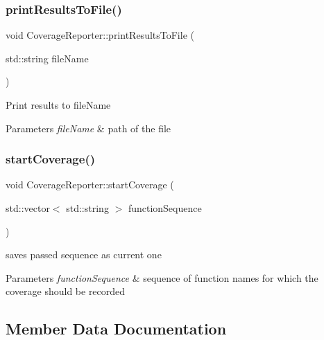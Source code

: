 \subsubsection{\texorpdfstring{print\+Results\+To\+File()}{printResultsToFile()}\hspace{0.1cm}{\footnotesize\ttfamily [2/2]}}
{\footnotesize\ttfamily void Coverage\+Reporter\+::print\+Results\+To\+File (\begin{DoxyParamCaption}\item[{std\+::string}]{file\+Name }\end{DoxyParamCaption})}

Print results to file\+Name 
\begin{DoxyParams}{Parameters}
{\em file\+Name} & path of the file \\
\hline
\end{DoxyParams}
\mbox{\label{classCoverageReporter_a560eff3e34be25d1a49c37ffd99e69c1}} 
\subsubsection{\texorpdfstring{start\+Coverage()}{startCoverage()}}
{\footnotesize\ttfamily void Coverage\+Reporter\+::start\+Coverage (\begin{DoxyParamCaption}\item[{std\+::vector$<$ std\+::string $>$}]{function\+Sequence }\end{DoxyParamCaption})}

saves passed sequence as current one 
\begin{DoxyParams}{Parameters}
{\em function\+Sequence} & sequence of function names for which the coverage should be recorded \\
\hline
\end{DoxyParams}


\subsection{Member Data Documentation}
\mbox{\label{classCoverageReporter_a395e6d59cc394e670fff1e8a575fc329}} 
